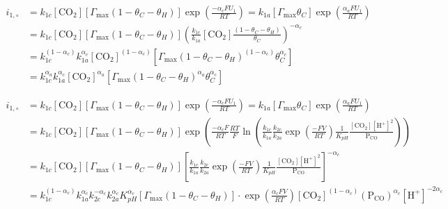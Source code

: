 \documentclass[12pt]{article}
\begin{document}
  \begin{equation*}
  \begin{split}
    i_{1,\circ} &= k_{1c} [{\text{CO}_2}] \left[\Gamma_{\max} (1 - \theta_C - \theta_H) \right] \exp{ \left( \frac{-\alpha_c F U_1}{RT} \right)}
    = k_{1a} \left[\Gamma_{\max} \theta_C \right] \exp{\left( \frac{\alpha_a F U_1}{RT} \right)}
    \\
    & = k_{1c} [{\text{CO}_2}] \left[\Gamma_{\max} (1 - \theta_C - \theta_H) \right] \left( \frac{k_{1c}}{k_{1a}} [{\text{CO}_2}] \frac{(1 - \theta_C - \theta_H)}{\theta_C} \right)^{-\alpha_c}
    \\
    & = k_{1c}^{(1-\alpha_c)} k_{1a}^{\alpha_c} [{\text{CO}_2}]^{(1-\alpha_c)} \left[\Gamma_{\max} (1 - \theta_C - \theta_H)^{(1-\alpha_c)} \theta_C^{\alpha_c} \right]
    \\
    & = k_{1c}^{\alpha_a} k_{1a}^{\alpha_c} [{\text{CO}_2}]^{\alpha_a} \left[\Gamma_{\max} (1 - \theta_C - \theta_H)^{\alpha_a} \theta_C^{\alpha_c} \right]
    \end{split}
  \end{equation*}

  \begin{equation*}
  \begin{split}
    i_{1,\circ} &= k_{1c} [{\text{CO}_2}] \left[\Gamma_{\max} (1 - \theta_C - \theta_H) \right] \exp{ \left( \frac{-\alpha_c F U_1}{RT} \right)}
    = k_{1a} \left[\Gamma_{\max} \theta_C \right] \exp{\left( \frac{\alpha_a F U_1}{RT} \right)}
    \\
    & = k_{1c} [{\text{CO}_2}] \left[\Gamma_{\max} (1 - \theta_C - \theta_H) \right] \exp{ \left( \frac{-\alpha_c F}{RT} \frac{RT}{F}
    \ln{ \left( \frac{k_{1c}}{k_{1a}} \frac{k_{2c}}{k_{2a}} \exp{ \left( \frac{-F V}{RT} \right)} \frac{1}{K_{pH}}
    \frac{[{\text{CO}_2}][\text{H}^+]^2}{\text{P}_{\text{CO}}} \right)} \right)}
    \\
    &= k_{1c} [{\text{CO}_2}] \left[\Gamma_{\max} (1 - \theta_C - \theta_H) \right] \left[ \frac{k_{1c}}{k_{1a}} \frac{k_{2c}}{k_{2a}} \exp{ \left( \frac{-F V}{RT} \right)} \frac{1}{K_{pH}}
    \frac{[{\text{CO}_2}][\text{H}^+]^2}{\text{P}_{\text{CO}}} \right]^{-\alpha_c}
    \\
    &= k_{1c}^{(1-\alpha_c)} k_{1a}^{\alpha_c} k_{2c}^{-\alpha_c} k_{2a}^{\alpha_c} K_{pH}^{\alpha_c} \left[\Gamma_{\max} (1 - \theta_C - \theta_H) \right] \cdot \exp{\left(\frac{\alpha_c F V}{RT} \right)}
    [{\text{CO}_2}]^{(1-\alpha_c)} \left(\text{P}_{\text{CO}}\right)^{\alpha_c} [{\text{H}^+}]^{-2\alpha_c}
    \end{split}
  \end{equation*}
\end{document}
